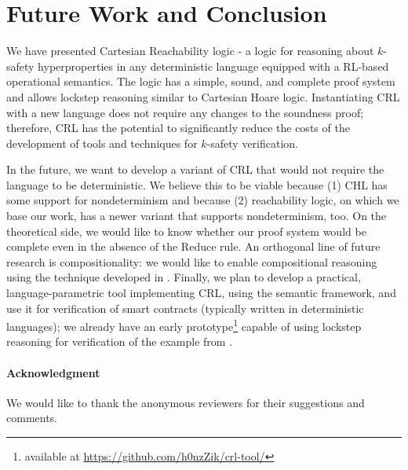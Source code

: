 \section{Future Work and Conclusion}

We have presented Cartesian Reachability logic - a logic for reasoning about $k$-safety hyperproperties
in any deterministic language equipped with a RL-based operational semantics.
The logic has a simple, sound, and complete proof system and allows lockstep reasoning
similar to Cartesian Hoare logic.
Instantiating CRL with a new language does not require any changes to the soundness proof;
therefore, CRL has the potential to significantly reduce the costs of the development of tools and techniques for $k$-safety verification.

In the future, we want to develop a variant of CRL that would not require the language to be deterministic.
We believe this to be viable because (1) CHL has some support for nondeterminism
and because (2) reachability logic, on which we base our work, has a newer variant that supports nondeterminism, too.
On the theoretical side, we would like to know whether our proof system would be complete even in the absence of
the Reduce rule.
An orthogonal line of future research is compositionality: we would like to enable compositional reasoning
using the technique developed in \cite{DOsualdoFD22}.
Finally, we plan to develop a practical, language-parametric tool implementing CRL,
using the \K{} semantic framework, and use it for verification of smart contracts
(typically written in deterministic languages);
we already have an early prototype\footnote{available at \url{https://github.com/h0nzZik/crl-tool/}}
capable of using lockstep reasoning for verification of the example from
.

\paragraph{Acknowledgment}
We would like to thank the anonymous reviewers for their suggestions and comments.
